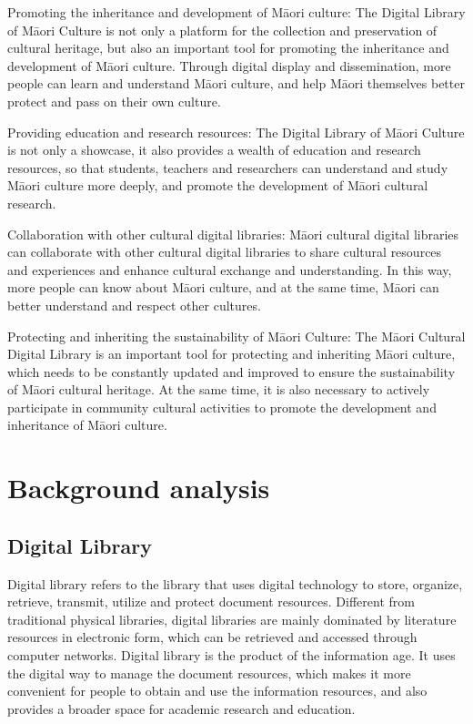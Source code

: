 Promoting the inheritance and development of Māori culture: The Digital Library of Māori Culture is not only a platform for the collection and preservation of cultural heritage, but also an important tool for promoting the inheritance and development of Māori culture. Through digital display and dissemination, more people can learn and understand Māori culture, and help Māori themselves better protect and pass on their own culture.

Providing education and research resources: The Digital Library of Māori Culture is not only a showcase, it also provides a wealth of education and research resources, so that students, teachers and researchers can understand and study Māori culture more deeply, and promote the development of Māori cultural research.

Collaboration with other cultural digital libraries: Māori cultural digital libraries can collaborate with other cultural digital libraries to share cultural resources and experiences and enhance cultural exchange and understanding. In this way, more people can know about Māori culture, and at the same time, Māori can better understand and respect other cultures.

Protecting and inheriting the sustainability of Māori Culture: The Māori Cultural Digital Library is an important tool for protecting and inheriting Māori culture, which needs to be constantly updated and improved to ensure the sustainability of Māori cultural heritage. At the same time, it is also necessary to actively participate in community cultural activities to promote the development and inheritance of Māori culture.
 
\section{Background analysis}

\subsection{Digital Library}

Digital library refers to the library that uses digital technology to store, organize, retrieve, transmit, utilize and protect document resources. Different from traditional physical libraries, digital libraries are mainly dominated by literature resources in electronic form, which can be retrieved and accessed through computer networks. Digital library is the product of the information age. It uses the digital way to manage the document resources, which makes it more convenient for people to obtain and use the information resources, and also provides a broader space for academic research and education\cite{HowtoBui15:online}.

